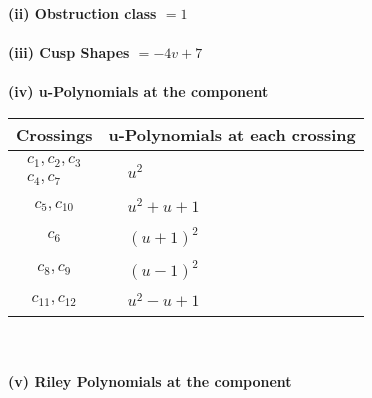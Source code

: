 \documentclass[1p]{elsarticle_modified}
\theoremstyle{definition}
\begin{document}
\flushleft \textbf{(ii) Obstruction class $= 1$}\\~\\
\flushleft \textbf{(iii) Cusp Shapes $= -4 v+7$}\\~\\
\newpage\renewcommand{\arraystretch}{1}
\flushleft \textbf{(iv) u-Polynomials at the component}\newline \\
\begin{tabular}{m{50pt}|m{274pt}}
Crossings & \hspace{64pt}u-Polynomials at each crossing \\
\hline $$\begin{aligned}c_{1},c_{2},c_{3}\\c_{4},c_{7}\end{aligned}$$&$\begin{aligned}
&u^2
\end{aligned}$\\
\hline $$\begin{aligned}c_{5},c_{10}\end{aligned}$$&$\begin{aligned}
&u^2+u+1
\end{aligned}$\\
\hline $$\begin{aligned}c_{6}\end{aligned}$$&$\begin{aligned}
&(u+1)^2
\end{aligned}$\\
\hline $$\begin{aligned}c_{8},c_{9}\end{aligned}$$&$\begin{aligned}
&(u-1)^2
\end{aligned}$\\
\hline $$\begin{aligned}c_{11},c_{12}\end{aligned}$$&$\begin{aligned}
&u^2- u+1
\end{aligned}$\\
\hline
\end{tabular}\\~\\
\newpage\renewcommand{\arraystretch}{1}
\flushleft \textbf{(v) Riley Polynomials at the component}\newline \\
\end{document}
